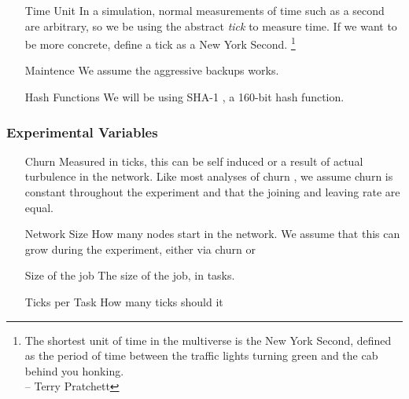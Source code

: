\begin{enumerate}
	\item[Time Unit] In a simulation, normal measurements of time such as a second are arbitrary, so we be using the abstract \textit{tick} to measure time.  
	If we want to be more concrete, define a tick as a New York Second. \footnote{The shortest unit of time in the multiverse is the New York Second, defined as the period of time between the traffic lights turning green and the cab behind you honking.\\-- Terry Pratchett}
	\item[Maintence] We assume the aggressive backups works.
	\item[Hash Functions] We will be using SHA-1 \cite{sha1}, a 160-bit hash function.
\end{enumerate}

\subsubsection{Experimental Variables}
\begin{enumerate}
	\item[Churn] Measured in ticks, this can be self induced or a result of actual turbulence in the network.
	Like most analyses of churn \cite{marozzo2012p2p}, we assume churn is constant throughout the experiment and that the joining and leaving rate are equal.
	\item[Network Size]  How many nodes start in the network.  We assume that this can grow during the experiment, either via churn or 
	\item[Size of the job] The size of the job, in tasks.
	\item[Ticks per Task] How many ticks should it
\end{enumerate}